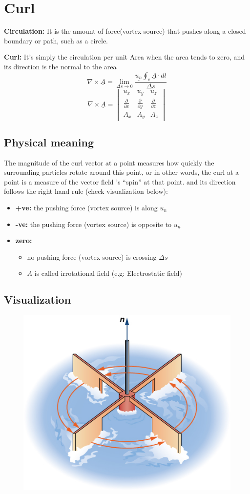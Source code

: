 \documentclass[12 pt]{article}
\begin{document}
\section{Curl}
\textbf{Circulation:} It is the amount of force(vortex source) that pushes along a closed boundary or path, such as a circle.

\textbf{Curl:} It's simply the circulation per unit Area when the area tends to zero, and its direction is the normal to the area
$$
\nabla\times\underline{A}=\lim_{\Delta s \to 0} \frac{ \underline{u_n}\oint_{c}\underline{A}\cdot dl}{\Delta s}
$$
$$
\nabla \times \underline{A}=
\begin{vmatrix}
u_x  & u_y  & u_z  \\ 
\frac{\partial{}}{\partial{x}} & \frac{\partial{}}{\partial{y}} & \frac{\partial{}}{\partial{z}} \\ 
A_x & A_y & A_z 
\end{vmatrix}
$$
\subsection{Physical meaning}
The magnitude of the curl vector at a point measures how quickly the surrounding particles rotate around this point, or in other words, the curl at a point is a measure of the vector field ’s “spin” at that point. and its direction follows the right hand rule (check visualization below):
\begin{itemize}
    \item \textbf{+ve:} the pushing force (vortex source) is along $u_n$
    \item \textbf{-ve:} the pushing force (vortex source) is opposite to $u_n$
    \item \textbf{zero: } \begin{itemize}
        \item no pushing force (vortex source) is crossing $\Delta s$ 
        \item $\underline{A}$ is called irrotational field (e.g: Electrostatic field)
    \end{itemize}
\end{itemize}
\subsection{Visualization}
    \begin{figure}[H]
    \centering
    \includegraphics[scale=0.75]{./images/curl}
    \label{curl} 
\end{figure}
\end{document}
